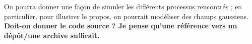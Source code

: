
On pourra donner une façon de simuler les différents processus
rencontrés ; en particulier, pour illustrer le propos, on pourrait
modéliser des champs gaussiens. \textbf{Doit-on donner le code source
? Je pense qu'une référence vers un dépôt/une archive suffirait.}